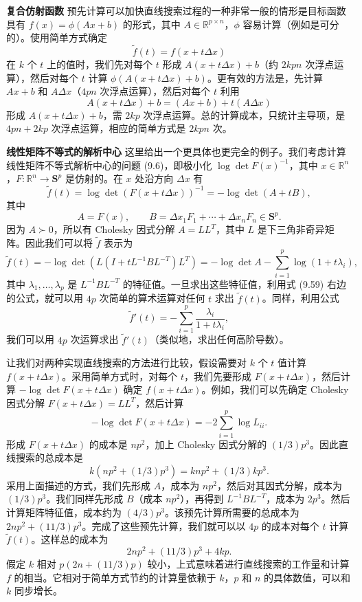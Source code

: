 \documentclass[UTF8,12pt,a4paper,fontset=fandol]{ctexart}
\begin{document}
\noindent\textbf{复合仿射函数}\quad
预先计算可以加快直线搜索过程的一种非常一般的情形是目标函数具有 $f(x)=\phi(Ax+b)$ 的形式，其中 $A\in\mathbb{R}^{p\times n}$，$\phi$ 容易计算（例如是可分的）。使用简单方式确定
\[
\tilde{f}(t)=f(x+t\Delta x)
\]
在 $k$ 个 $t$ 上的值时，我们先对每个 $t$ 形成 $A(x+t\Delta x)+b$（约 $2kpn$ 次浮点运算），然后对每个 $t$ 计算 $\phi(A(x+t\Delta x)+b)$。更有效的方法是，先计算 $Ax+b$ 和 $A\Delta x$（$4pn$ 次浮点运算），然后对每个 $t$ 利用
\[
A(x+t\Delta x)+b=(Ax+b)+t(A\Delta x)
\]
形成 $A(x+t\Delta x)+b$，需 $2kp$ 次浮点运算。总的计算成本，只统计主导项，是 $4pn+2kp$ 次浮点运算，相应的简单方式是 $2kpn$ 次。

\noindent\textbf{线性矩阵不等式的解析中心}\quad
这里给出一个更具体也更完全的例子。我们考虑计算线性矩阵不等式解析中心的问题 (9.6)，即极小化 $\log\det F(x)^{-1}$，其中 $x\in\mathbb{R}^n$，$F:\mathbb{R}^n\to\mathbf{S}^p$ 是仿射的。在 $x$ 处沿方向 $\Delta x$ 有
\[
\tilde{f}(t)=\log\det(F(x+t\Delta x))^{-1}=-\log\det(A+tB),
\]
其中
\[
A=F(x),\qquad B=\Delta x_1F_1+\cdots+\Delta x_nF_n\in\mathbf{S}^p.
\]
因为 $A\succ0$，所以有 Cholesky 因式分解 $A=LL^T$，其中 $L$ 是下三角非奇异矩阵。因此我们可以将 $\tilde{f}$ 表示为
\begin{equation}
\tilde{f}(t)=-\log\det\left(L(I+tL^{-1}BL^{-T})L^T\right)
=-\log\det A-\sum_{i=1}^p\log(1+t\lambda_i),
\tag{9.59}
\end{equation}
其中 $\lambda_1,\ldots,\lambda_p$ 是 $L^{-1}BL^{-T}$ 的特征值。一旦求出这些特征值，利用式 (9.59) 右边的公式，就可以用 $4p$ 次简单的算术运算对任何 $t$ 求出 $\tilde{f}(t)$。同样，利用公式
\[
\tilde{f}'(t)=-\sum_{i=1}^p\frac{\lambda_i}{1+t\lambda_i},
\]
我们可以用 $4p$ 次运算求出 $\tilde{f}'(t)$（类似地，求出任何高阶导数）。

让我们对两种实现直线搜索的方法进行比较，假设需要对 $k$ 个 $t$ 值计算 $f(x+t\Delta x)$。采用简单方式时，对每个 $t$，我们先要形成 $F(x+t\Delta x)$，然后计算 $-\log\det F(x+t\Delta x)$ 确定 $f(x+t\Delta x)$。例如，我们可以先确定 Cholesky 因式分解 $F(x+t\Delta x)=LL^T$，然后计算
\[
-\log\det F(x+t\Delta x)=-2\sum_{i=1}^p\log L_{ii}.
\]
形成 $F(x+t\Delta x)$ 的成本是 $np^2$，加上 Cholesky 因式分解的 $(1/3)p^3$。因此直线搜索的总成本是
\[
k(np^2+(1/3)p^3)=knp^2+(1/3)kp^3.
\]
采用上面描述的方式，我们先形成 $A$，成本为 $np^2$，然后对其因式分解，成本为 $(1/3)p^3$。我们同样先形成 $B$（成本 $np^2$），再得到 $L^{-1}BL^{-T}$，成本为 $2p^3$。然后计算矩阵特征值，成本约为 $(4/3)p^3$。该预先计算所需要的总成本为 $2np^2+(11/3)p^3$。完成了这些预先计算，我们就可以以 $4p$ 的成本对每个 $t$ 计算 $\tilde{f}(t)$。这样总的成本为
\[
2np^2+(11/3)p^3+4kp.
\]
假定 $k$ 相对 $p(2n+(11/3)p)$ 较小，上式意味着进行直线搜索的工作量和计算 $f$ 的相当。它相对于简单方式节约的计算量依赖于 $k$，$p$ 和 $n$ 的具体数值，可以和 $k$ 同步增长。
\end{document}
